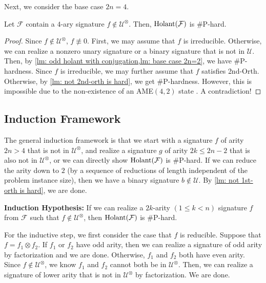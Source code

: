 Next, we consider the base case $2n=4$.
\begin{lemma}\label{lm: base case 2n=4}
    Let ${\mathcal{F}}$ contain a $4$-ary signature ${f}\notin {\mathcal{U}}^{\otimes}$.
    Then, $\operatorname{Holant}({\mathcal F})$ is {\rm \#}P-hard.
\end{lemma}

\begin{proof}
    Since ${f}\notin{{\mathcal{U}}}^{\otimes}$, $f\not\equiv 0$.
    First, we may assume that $f$ is irreducible. 
    Otherwise, we can realize a nonzero unary signature or a binary signature that is not in ${\mathcal{U}}$.
    Then, by \cref{lm: odd holant with conjugation,lm: base case 2n=2}, we have \#P-hardness.
    Since $f$ is irreducible, we may further assume that ${f}$ satisfies {\sc 2nd-Orth}.
    Otherwise, by \cref{lm: not 2nd-orth is hard}, we get \#P-hardness. 
    However, this is impossible due to the non-existence of an \rm{AME}$(4,2)$ state {\cite{AME42}}.
    A contradiction!
\end{proof}

\subsection{Induction Framework}\label{subsec: Induction framework}
The general induction framework is  that we start with a signature $f$ of arity $2n>4$ that is not in ${\mathcal{U}}^{\otimes}$, and realize a signature $g$ of arity $2k \leqslant 2n-2$ that is also not in ${\mathcal{U}}^{\otimes}$, or we can directly show $\operatorname{Holant}({\mathcal F})$ is {\rm \#}P-hard.
If we can reduce the arity down to $2$ (by a sequence of reductions of length independent of the problem instance size), then we have a binary signature ${b}\notin{\mathcal{U}}$. 
By \cref{lm: not 1st-orth is hard}, we are done.

\vspace{0.5em}
\noindent\textbf{Induction Hypothesis:} If we can realize a $2k$-arity $(1\le k<n)$ signature $f$ from $\mathcal{F}$ such that $f\notin \mathcal{U}^{\otimes}$, then $\operatorname{Holant}(\mathcal{F})$ is \#P-hard.
\vspace{0.5em}

For the inductive step, we first consider the case that ${f}$ is reducible.
Suppose that ${f}={f_1} \otimes {f_2}$.
If ${f_1}$ or ${f_2}$ have odd arity, then we can realize a signature of odd arity by factorization and we are done.
Otherwise, ${f_1}$ and ${f_2}$ both have even arity. 
Since ${f}\notin {\mathcal{U}}^{\otimes}$, we know ${f_1}$ and ${f_2}$ cannot both be in ${\mathcal{U}}^{\otimes}$. 
Then, we can realize a signature of lower arity that is not in ${\mathcal{U}}^{\otimes}$ by factorization. 
We are done.

